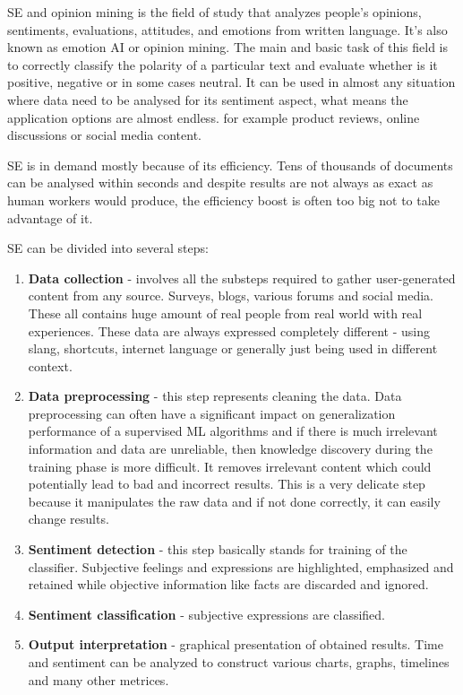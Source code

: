 SE and opinion mining is the field of study that analyzes people's opinions, sentiments, evaluations, attitudes, and emotions from written language.\cite{liu2012sentiment} It's also known as emotion AI or opinion mining. The main and basic task of this field is to correctly classify the polarity of a particular text and evaluate whether is it positive, negative or in some cases neutral. It can be used in almost any situation where data need to be analysed for its sentiment aspect, what means the application options are almost endless.  for example product reviews, online discussions or social media content.

SE is in demand mostly because of its efficiency. Tens of thousands of documents can be analysed within seconds and despite results are not always as exact as human workers would produce, the efficiency boost is often too big not to take advantage of it.

SE can be divided into several steps:
\begin{enumerate}
  \item \textbf{Data collection} - involves all the substeps required to gather user-generated content from any source. Surveys, blogs, various forums and social media. These all contains huge amount of real people from real world with real experiences. These data are always expressed completely different - using slang, shortcuts, internet language or generally just being used in different context.
  \item \textbf{Data preprocessing} - this step represents cleaning the data. Data preprocessing can often have a significant impact on generalization performance of a supervised ML algorithms \cite{kotsiantis2006data} and if there is much irrelevant information and data are unreliable, then knowledge discovery during the training phase is more difficult. It removes irrelevant content which could potentially lead to bad and incorrect results. This is a very delicate step because it manipulates the raw data and if not done correctly, it can easily change results.
  \item \textbf{Sentiment detection} - this step basically stands for training of the classifier. Subjective feelings and expressions are highlighted, emphasized and retained while objective information like facts are discarded and ignored. 
  \item \textbf{Sentiment classification} - subjective expressions are classified.
    \item \textbf{Output interpretation} - graphical presentation of obtained results. Time and sentiment can be analyzed to construct various charts, graphs, timelines and many other metrices.
\end{enumerate}

